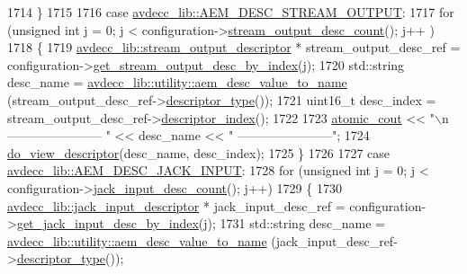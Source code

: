 \begin{DoxyCode}
1714         \}
1715 
1716     \textcolor{keywordflow}{case} \hyperlink{namespaceavdecc__lib_ac7b7d227e46bc72b63ee9e9aae15902fa3e5e9421e49598854000feaa2fe71464}{avdecc\_lib::AEM\_DESC\_STREAM\_OUTPUT}:
1717         \textcolor{keywordflow}{for} (\textcolor{keywordtype}{unsigned} \textcolor{keywordtype}{int} j = 0; j < configuration->\hyperlink{classavdecc__lib_1_1configuration__descriptor_a9ebee6c612e3cfec50f5168790bd265c}{stream\_output\_desc\_count}(); j++
      )
1718         \{
1719             \hyperlink{classavdecc__lib_1_1stream__output__descriptor}{avdecc\_lib::stream\_output\_descriptor} * 
      stream\_output\_desc\_ref = configuration->\hyperlink{classavdecc__lib_1_1configuration__descriptor_a300ea5957342e2e9579318135da02856}{get\_stream\_output\_desc\_by\_index}(j);
1720             std::string desc\_name = \hyperlink{namespaceavdecc__lib_1_1utility_a6bdd02679e5a911a071d4aa03be341f0}{avdecc\_lib::utility::aem\_desc\_value\_to\_name}
      (stream\_output\_desc\_ref->\hyperlink{classavdecc__lib_1_1descriptor__base_a5112b70022171063ec5d3242bee9910e}{descriptor\_type}());
1721             uint16\_t desc\_index = stream\_output\_desc\_ref->\hyperlink{classavdecc__lib_1_1descriptor__base_a7eed5583bffdf72d89021b188648c1b5}{descriptor\_index}();
1722 
1723             \hyperlink{cmd__line_8h_a0bc38ccc65c79ba06c6fcd7b4bf554c3}{atomic\_cout} << \textcolor{stringliteral}{"\(\backslash\)n----------------------- "} << desc\_name << \textcolor{stringliteral}{"
       -----------------------"};
1724             \hyperlink{classcmd__line_aef7d9f8c4eff85c46e5b7aea0961bb51}{do\_view\_descriptor}(desc\_name, desc\_index);
1725         \}
1726 
1727     \textcolor{keywordflow}{case} \hyperlink{namespaceavdecc__lib_ac7b7d227e46bc72b63ee9e9aae15902fad87274c58574381f0b40cad5a6468978}{avdecc\_lib::AEM\_DESC\_JACK\_INPUT}:
1728         \textcolor{keywordflow}{for} (\textcolor{keywordtype}{unsigned} \textcolor{keywordtype}{int} j = 0; j < configuration->\hyperlink{classavdecc__lib_1_1configuration__descriptor_a35f643c39d514fca78d2536149b664a9}{jack\_input\_desc\_count}(); j++)
1729         \{
1730             \hyperlink{classavdecc__lib_1_1jack__input__descriptor}{avdecc\_lib::jack\_input\_descriptor} * jack\_input\_desc\_ref = 
      configuration->\hyperlink{classavdecc__lib_1_1configuration__descriptor_a15cc383da412f84492d0d61cb581a8e1}{get\_jack\_input\_desc\_by\_index}(j);
1731             std::string desc\_name = \hyperlink{namespaceavdecc__lib_1_1utility_a6bdd02679e5a911a071d4aa03be341f0}{avdecc\_lib::utility::aem\_desc\_value\_to\_name}
      (jack\_input\_desc\_ref->\hyperlink{classavdecc__lib_1_1descriptor__base_a5112b70022171063ec5d3242bee9910e}{descriptor\_type}());

\end{DoxyCode}
